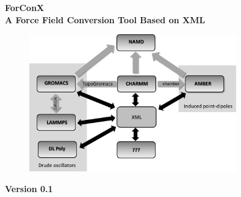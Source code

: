 \documentclass[12pt]{article}
\begin{document}
\begin{titlepage}
 \centering \vspace*{3cm}
 \textbf{\Huge ForConX} \\ \vspace{1cm}
 \textbf{\Large A Force Field Conversion Tool Based on XML} \\ \vspace{2cm}
 \begin{figure}[H]
  \centering
  \includegraphics[width=0.8\textwidth]{ForConX_bw.png}
 \end{figure}
 \textbf{\large Version 0.1}\\

\end{titlepage}

\tableofcontents
\pagebreak

 
\end{document}
